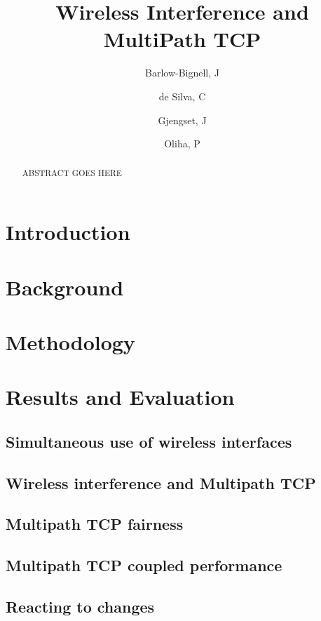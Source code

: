 \documentclass[12pt,a4paper]{article}
\title{Wireless Interference and MultiPath TCP}
\author{Barlow-Bignell, J}
\author{de Silva, C}
\author{Gjengset, J}
\author{Oliha, P}
\affil{University College London}
\date{}
\begin{document}
\maketitle

\begin{abstract}
  ABSTRACT GOES HERE
\end{abstract}
\clearpage

\section{Introduction}


\section{Background}


\section{Methodology}


\section{Results and Evaluation}

\subsection{Simultaneous use of wireless interfaces}
\label{sec:results-wifi}

\subsection{Wireless interference and Multipath TCP}
\label{sec:results-mptcp}

\subsection{Multipath TCP fairness}
\label{sec:results-fairness}

\subsection{Multipath TCP coupled performance}
\label{sec:results-performance}

\subsection{Reacting to changes}
\label{sec:results-reacting}

\end{document}
